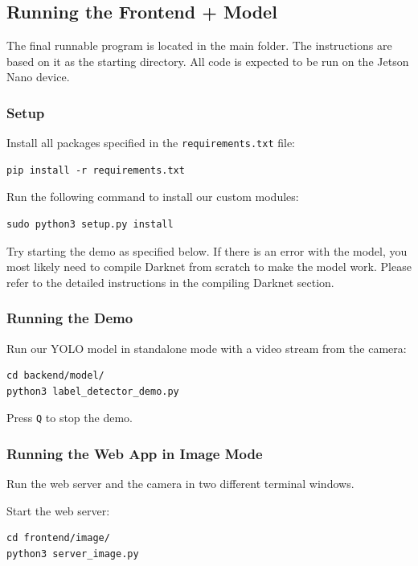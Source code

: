 \subsection{Running the Frontend + Model}
The final runnable program is located in the main folder. The instructions are based on it as the starting directory. All code is expected to be run on the Jetson Nano device.

\subsubsection*{Setup}

Install all packages specified in the \texttt{requirements.txt} file:

\begin{lstlisting}[style=bash]
pip install -r requirements.txt
\end{lstlisting}

Run the following command to install our custom modules:

\begin{lstlisting}[style=bash]
sudo python3 setup.py install
\end{lstlisting}

Try starting the demo as specified below. If there is an error with the model, you most likely need to compile Darknet from scratch to make the model work. Please refer to the detailed instructions in the compiling Darknet section.

\subsubsection*{Running the Demo}

Run our YOLO model in standalone mode with a video stream from the camera:

\begin{lstlisting}[style=bash]
cd backend/model/
python3 label_detector_demo.py
\end{lstlisting}

Press \texttt{Q} to stop the demo.

\subsubsection*{Running the Web App in Image Mode}

Run the web server and the camera in two different terminal windows.

Start the web server:

\begin{lstlisting}[style=bash]
cd frontend/image/
python3 server_image.py
\end{lstlisting}


